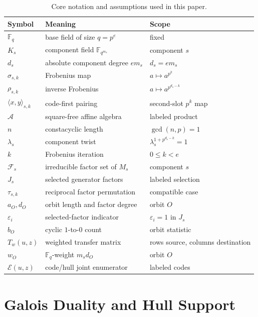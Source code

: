 \documentclass[11pt]{article}
\newcommand{\F}{\mathbb F}
\newcommand{\A}{\mathcal A}
\newcommand{\Fs}{\mathcal F_s}
\newcommand{\Epoly}{\mathscr E}
\theoremstyle{plain}
\theoremstyle{definition}
\theoremstyle{remark}
\begin{document}
\begin{table}[ht]
\centering
\caption{Core notation and assumptions used in this paper.}
\label{tab:notation}
\small
\begin{tabular}{|l|l|l|}
\hline
Symbol & Meaning & Scope \\
\hline
$\F_q$ & base field of size $q=p^e$ & fixed \\
\hline
$K_s$ & component field $\F_{q^{m_s}}$ & component $s$ \\
\hline
$d_s$ & absolute component degree $e m_s$ & $d_s=e m_s$ \\
\hline
$\sigma_{s,k}$ & Frobenius map & $a\mapsto a^{p^k}$ \\
\hline
$\rho_{s,k}$ & inverse Frobenius & $a\mapsto a^{p^{d_s-k}}$ \\
\hline
$\langle x,y\rangle_{s,k}$ & code-first pairing & second-slot $p^k$ map \\
\hline
$\A$ & square-free affine algebra & labeled product \\
\hline
$n$ & constacyclic length & $\gcd(n,p)=1$ \\
\hline
$\lambda_s$ & component twist & $\lambda_s^{1+p^{d_s-k}}=1$ \\
\hline
$k$ & Frobenius iteration & $0\leq k<e$ \\
\hline
$\Fs$ & irreducible factor set of $M_s$ & component $s$ \\
\hline
$J_s$ & selected generator factors & labeled selection \\
\hline
$\tau_{s,k}$ & reciprocal factor permutation & compatible case \\
\hline
$a_O,d_O$ & orbit length and factor degree & orbit $O$ \\
\hline
$\varepsilon_i$ & selected-factor indicator & $\varepsilon_i=1$ in $J_s$ \\
\hline
$b_O$ & cyclic $1$-to-$0$ count & orbit statistic \\
\hline
$T_w(u,z)$ & weighted transfer matrix & rows source, columns destination \\
\hline
$w_O$ & $\F_q$-weight $m_s d_O$ & orbit $O$ \\
\hline
$\Epoly(u,z)$ & code/hull joint enumerator & labeled codes \\
\hline
\end{tabular}
\end{table}

\section{Galois Duality and Hull Support}\label{sec:duality}
\end{document}
